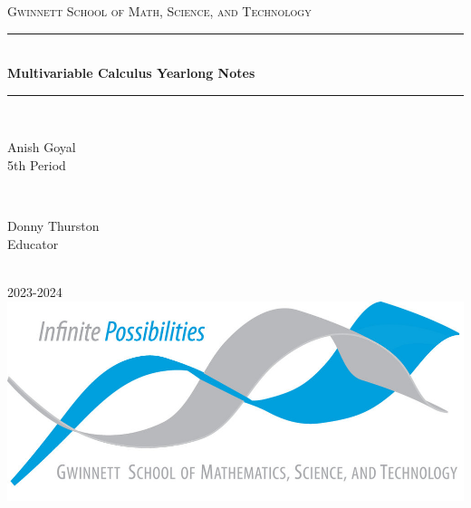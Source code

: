 \begin{titlepage}

    \newcommand{\HRule}{\rule{\linewidth}{0.5mm}}
    
    \center
    
    \vspace{10cm}

    \textsc{\LARGE Gwinnett School of Math, Science, and Technology }\\[0.3cm]
    
    \vspace{0.5cm}

    \HRule \\[0.4cm]
    { \huge \bfseries Multivariable Calculus Yearlong Notes}\\[0.03cm]
    \HRule \\[1.5cm]
    
    \begin{minipage}{0.4\textwidth}
    \begin{flushleft} \Large
    Anish Goyal \\5th Period
    \end{flushleft}
    \end{minipage}
    ~
    \begin{minipage}{0.4\textwidth}
    \begin{flushright} \Large
    Donny Thurston\\Educator
    \end{flushright}
    \end{minipage}\\[1cm]
    
    {\huge 2023-2024}\\[1cm]
    
    \includegraphics{img/logo.png}\\
    \vfill
    \end{titlepage}